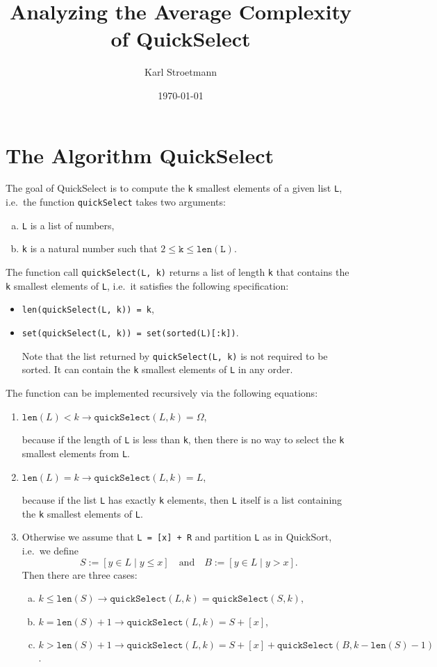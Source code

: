 \documentclass{article}
\author{Karl Stroetmann}
\title{Analyzing the Average Complexity of QuickSelect}
\date{\today}
\newcommand{\blue}[1]{{\color{blue}#1}}
\begin{document}
\maketitle

\section{The Algorithm \blue{QuickSelect}}
The goal of QuickSelect is to compute the \texttt{k} smallest elements of a given list \texttt{L},
i.e.~the function \texttt{quickSelect} takes two arguments:
\begin{enumerate}[(a)]
\item \texttt{L} is a list of numbers,
\item \texttt{k} is a natural number such that $2 \leq \texttt{k} \leq \texttt{len}(\texttt{L})$.
\end{enumerate}
The function call \texttt{quickSelect(L, k)} returns a list of length \texttt{k} that contains the \texttt{k} smallest
elements of \texttt{L}, i.e.~it satisfies the following specification:
\begin{itemize}
\item \texttt{len(quickSelect(L, k)) = k},
\item \texttt{set(quickSelect(L, k)) = set(sorted(L)[:k])}.

      Note that the list returned by \texttt{quickSelect(L, k)} is not required to be sorted.  It can contain
      the \texttt{k} smallest elements of \texttt{L} in any order.
\end{itemize}
The function can be implemented recursively via the following equations:
\begin{enumerate}[1.]
\item $\texttt{len}(L) < k \rightarrow \texttt{quickSelect}(L,k) = \Omega$,

      because if the length of \texttt{L} is less than \texttt{k}, then there is no way to select the
      \texttt{k} smallest elements from \texttt{L}.
\item $\texttt{len}(L) = k \rightarrow \texttt{quickSelect}(L,k) = L$,

      because if the list \texttt{L} has exactly \texttt{k} elements, then \texttt{L} itself is a list
      containing the \texttt{k} smallest elements of \texttt{L}.
\item Otherwise we assume that \texttt{L = [x] + R} and partition \texttt{L} as in \blue{QuickSort}, i.e.~we define
   $$ S := [y \in L \mid y \leq x] \quad \mbox{and} \quad B := [y \in L \mid y > x]. $$
      Then there are three cases:
      \begin{enumerate}[(a)]
      \item $k \leq \texttt{len}(S) \rightarrow \texttt{quickSelect}(L, k) = \texttt{quickSelect}(S, k)$,
      \item $k = \texttt{len}(S) + 1 \rightarrow \texttt{quickSelect}(L, k) = S + [x]$,
      \item $k > \texttt{len}(S) + 1 \rightarrow 
      \texttt{quickSelect}(L, k) = S + [x] + \texttt{quickSelect}(B, k - \texttt{len}(S) - 1)$.
    \end{enumerate}
\end{enumerate}
\end{document}
